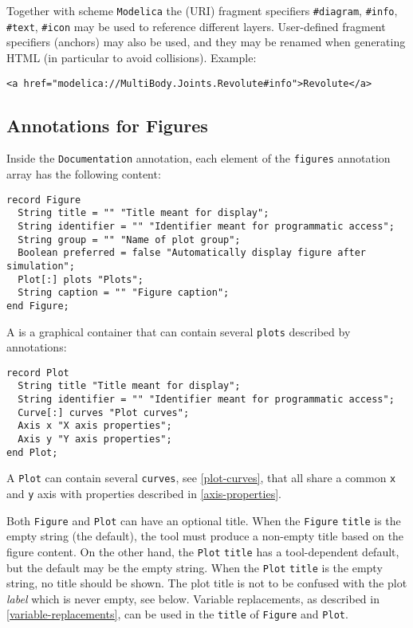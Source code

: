 Together with scheme \lstinline!Modelica! the (URI) fragment specifiers
\lstinline!#diagram!, \lstinline!#info!, \lstinline!#text!, \lstinline!#icon! may be used to reference different
layers. User-defined fragment specifiers (anchors) may also be used, and they may be renamed
when generating HTML (in particular to avoid collisions).
Example:
\begin{lstlisting}[language=modelica]
<a href="modelica://MultiBody.Joints.Revolute#info">Revolute</a>
\end{lstlisting}

\subsection{Annotations for Figures}\label{annotations-for-figures}

Inside the \lstinline!Documentation! annotation, each element of the \lstinline!figures! annotation array has the following content:
\begin{lstlisting}[language=modelica]
record Figure
  String title = "" "Title meant for display";
  String identifier = "" "Identifier meant for programmatic access";
  String group = "" "Name of plot group";
  Boolean preferred = false "Automatically display figure after simulation";
  Plot[:] plots "Plots";
  String caption = "" "Figure caption";
end Figure;
\end{lstlisting}

A  is a graphical container that can contain several \lstinline!plots! described by  annotations:
\begin{lstlisting}[language=modelica]
record Plot
  String title "Title meant for display";
  String identifier = "" "Identifier meant for programmatic access";
  Curve[:] curves "Plot curves";
  Axis x "X axis properties";
  Axis y "Y axis properties";
end Plot;
\end{lstlisting}

A \lstinline!Plot! can contain several \lstinline!curves!, see \cref{plot-curves}, that all share a common \lstinline!x! and \lstinline!y! axis with properties described in \cref{axis-properties}.

Both \lstinline!Figure! and \lstinline!Plot! can have an optional title. When
the \lstinline!Figure! \lstinline!title! is the empty string (the default), the
tool must produce a non-empty title based on the figure content.  On the other
hand, the \lstinline!Plot! \lstinline!title! has a tool-dependent default, but
the default may be the empty string.  When the \lstinline!Plot! \lstinline!title! is the empty string, no
title should be shown. The plot title is not to be confused with the plot
\emph{label} which is never empty, see below. Variable replacements, as
described in \cref{variable-replacements}, can be used in the
\lstinline!title! of \lstinline!Figure! and \lstinline!Plot!.

